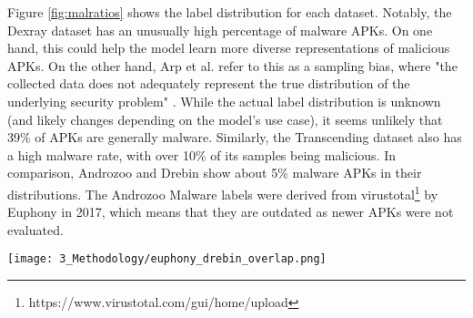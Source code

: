 Figure \ref{fig:malratios} shows the label distribution for each dataset. 
Notably, the Dexray dataset has an unusually high percentage of malware APKs. 
On one hand, this could help the model learn more diverse representations of malicious APKs. 
On the other hand, Arp et al. refer to this as a sampling bias, where "the collected data does not adequately represent the true distribution of the underlying security problem" \cite{dodo}. 
While the actual label distribution is unknown (and likely changes depending on the model's use case), it seems unlikely that 39\% of APKs are generally malware. 
Similarly, the Transcending dataset also has a high malware rate, with over 10\% of its samples being malicious. 
In comparison, Androzoo and Drebin show about 5\% malware APKs in their distributions. 
The Androzoo Malware labels were derived from virustotal\footnote{https://www.virustotal.com/gui/home/upload} by Euphony \cite{androzoo_malware} in 2017, 
which means that they are outdated as newer APKs were not evaluated.

\begin{marginfigure}[-50pt] %
    \texttt{[image: 3\_Methodology/euphony\_drebin\_overlap.png]}
    \caption{\label{fig:euphony_drebin_overlap}
    Overlap between the Drebin and Euphony datasets. 
    The light blue circle represents Drebin, where 112,109 APKs are classified as goodware (excluding overlap).
    The red circle represents Euphony, which contains 1,316,025 APKs labeled as malware (excluding overlap). 
    The dark blue circle represent those 5560 APKs, that are considered malware for both Drebin and Euphony.
    The intersection in orange highlights 11,344 APKs classified as goodware by Drebin but as malware by Euphony.}
\end{marginfigure}

